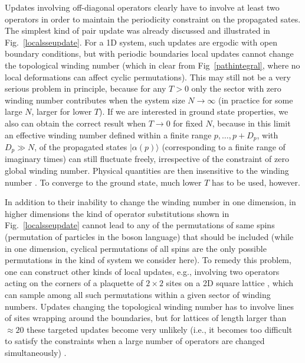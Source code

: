 \documentclass[draft,numberedheadings]{aipproc}
\begin{document}
Updates involving off-diagonal operators clearly have to involve at least two operators in order to maintain the periodicity constraint on the
propagated sates. The simplest kind of pair update was already discussed and illustrated in Fig.~\ref{localsseupdate}. For a 1D system, such 
updates are ergodic with open boundary conditions, but with periodic boundaries local updates cannot change the topological winding number (which
in clear from Fig~\ref{pathintegral}, where no local deformations can affect cyclic permutations). 
This may still not be a very serious problem in principle, because for any $T>0$ only the sector with zero winding number contributes when the 
system size $N \to \infty$ (in practice for some large $N$, larger for lower $T$). If we are interested in ground state properties, we also can obtain 
the correct result when $T\to 0$ for fixed $N$, because in this limit an effective winding number defined within a finite range $p,\ldots,p+D_p$, with
$D_p\gg N$, of the propagated states $|\alpha(p)\rangle$ (corresponding to a finite range of imaginary times) can still fluctuate freely, irrespective 
of the constraint of zero global winding number. Physical quantities are then insensitive to the winding number \cite{henelius98}. To converge to the 
ground state, much lower $T$ has to be used, however.

In addition to their inability to change the winding number in one dimension, in higher dimensions the kind of operator substitutions shown in 
Fig.~\ref{localsseupdate} cannot lead to any of the permutations of same spins (permutation of particles in the boson language) that should be included 
(while in one dimension, cyclical permutations of all spins are the only possible permutations in the kind of system we consider here). To remedy this 
problem, one can construct other kinds of local updates, e.g., involving two operators acting on the corners of a plaquette of $2\times 2$ sites
on a 2D square lattice \cite{sandvik97}, which can sample among all such permutations within a given sector of winding numbers. Updates changing the 
topological winding number has to involve lines of sites wrapping around the boundaries, but for lattices of length larger than $\approx 20$ these 
targeted updates become very unlikely (i.e., it becomes too difficult to satisfy the constraints when a large number of operators are changed simultaneously) 
\cite{sandvik90,sandvik97}.
\end{document}
